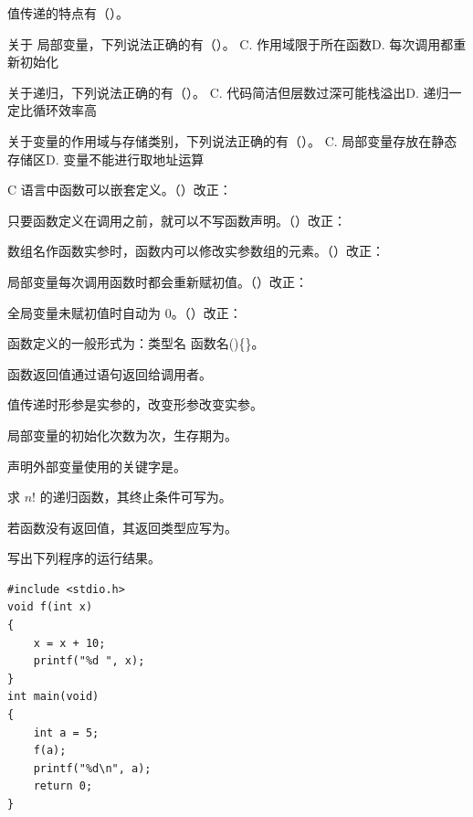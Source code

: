 \documentclass[a4paper,11pt]{article}
\begin{document}
\q 值传递的特点有（\quad）。

\q 关于  局部变量，下列说法正确的有（\quad）。
{C. 作用域限于所在函数}{D. 每次调用都重新初始化}

\q 关于递归，下列说法正确的有（\quad）。
{C. 代码简洁但层数过深可能栈溢出}{D. 递归一定比循环效率高}

\q 关于变量的作用域与存储类别，下列说法正确的有（\quad）。
{C.  局部变量存放在静态存储区}{D.  变量不能进行取地址运算}

\q C 语言中函数可以嵌套定义。\quad（\quad）\quad 改正：\fixblank

\q 只要函数定义在调用之前，就可以不写函数声明。\quad（\quad）\quad 改正：\fixblank

\q 数组名作函数实参时，函数内可以修改实参数组的元素。\quad（\quad）\quad 改正：\fixblank

\q {} 局部变量每次调用函数时都会重新赋初值。\quad（\quad）\quad 改正：\fixblank

\q 全局变量未赋初值时自动为 0。\quad（\quad）\quad 改正：\fixblank

\q 函数定义的一般形式为：类型名 函数名(\fillblanks[2.2cm])\{\fillblanks[2.2cm]\}。

\q 函数返回值通过\fillblanks[1.4cm]语句返回给调用者。

\q 值传递时形参是实参的\fillblanks[1.4cm]，改变形参\fillblanks[1.0cm]改变实参。

\q {} 局部变量的初始化次数为\fillblank{}次，生存期为\fillblanks[2.6cm]。

\q 声明外部变量使用的关键字是\fillblanks[1.6cm]。

\q 求 $n!$ 的递归函数，其终止条件可写为\fillblanks[2.4cm]。

\q 若函数没有返回值，其返回类型应写为\fillblanks[1.2cm]。

\q 写出下列程序的运行结果。
\begin{lstlisting}[language={[custom]C}]
#include <stdio.h>
void f(int x)
{
    x = x + 10;
    printf("%d ", x);
}
int main(void)
{
    int a = 5;
    f(a);
    printf("%d\n", a);
    return 0;
}
\end{lstlisting}
\anslines{2.4cm}
\end{document}
